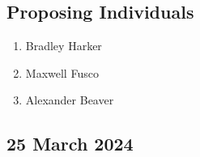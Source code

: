\begin{enumerate}
            \subsection{Proposing Individuals}
            \begin{enumerate}
                  \item Bradley Harker
                  \item Maxwell Fusco
                  \item Alexander Beaver
            \end{enumerate}
\end{enumerate}

\subsection{25 March 2024}
